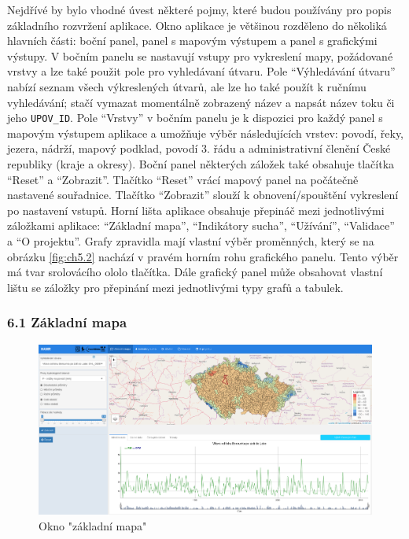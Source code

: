 \documentclass[12pt,]{article}
\begin{document}
\qquad Nejdřívé by bylo vhodné úvest některé pojmy, které budou
používány pro popis základního rozvržení aplikace. Okno aplikace je
většinou rozděleno do několiká hlavních části: boční panel, panel s
mapovým výstupem a panel s grafickými výstupy. V bočním panelu se
nastavují vstupy pro vykreslení mapy, požádované vrstvy a lze také
použit pole pro vyhledávaní útvaru. Pole \enquote{Výhledávání útvaru}
nabízí seznam všech výkreslených útvarů, ale lze ho také použít k
ručnímu vyhledávání; stačí vymazat momentálně zobrazený název a napsát
název toku či jeho \texttt{UPOV\_ID}. Pole \enquote{Vrstvy} v bočním
panelu je k dispozici pro každý panel s mapovým výstupem aplikace a
umožňuje výběr následujících vrstev: povodí, řeky, jezera, nádrží,
mapový podklad, povodí 3. řádu a administrativní členění České republiky
(kraje a okresy). Boční panel některých záložek také obsahuje tlačítka
\enquote{Reset} a \enquote{Zobrazit}. Tlačítko \enquote{Reset} vrácí
mapový panel na počátečně nastavené souřadnice. Tlačítko
\enquote{Zobrazit} slouží k obnovení/spouštění vykreslení po nastavení
vstupů. Horní lišta aplikace obsahuje přepináč mezi jednotlivými
záložkami aplikace: \enquote{Základní mapa}, \enquote{Indikátory sucha},
\enquote{Užívání}, \enquote{Validace} a \enquote{O projektu}. Grafy
zpravidla mají vlastní výběr proměnných, který se na obrázku
\ref{fig:ch5.2} nachází v pravém horním rohu grafického panelu. Tento
výběr má tvar srolovácího ololo tlačítka. Dále grafický panel může
obsahovat vlastní lištu se záložky pro přepinání mezi jednotlivými typy
grafů a tabulek.

\subsubsection{6.1 Základní mapa}\label{zakladni-mapa}

\begin{figure}[H]
      \includegraphics[width=\textwidth]{fig/P_ZM}
      \caption{Okno "základní mapa"}
      \label{fig:ch5.3}
\end{figure}
\end{document}
